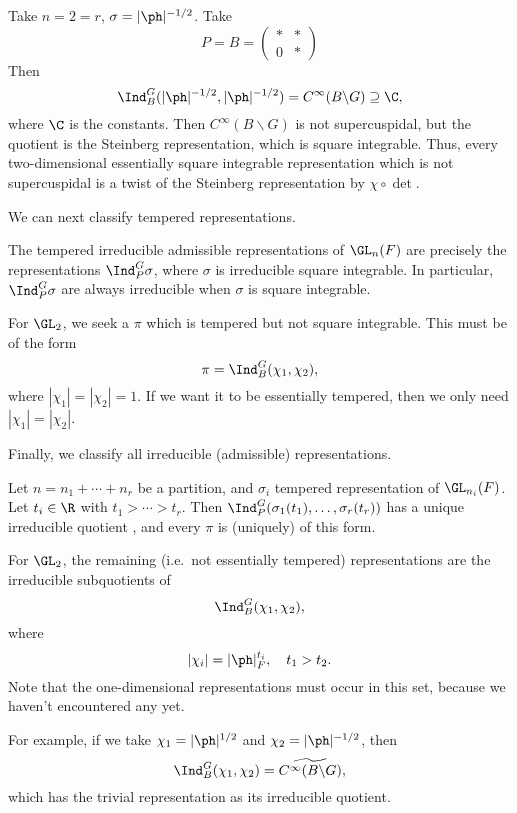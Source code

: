 \documentclass[a4paper]{article}
\begin{document}
\begin{eg}
  Take $n = 2 = r$, $\sigma = |\ph|^{-1/2}$. Take
  \[
    P = B =
    \begin{pmatrix}
      * & *\\
      0 & *
    \end{pmatrix}
  \]
  Then
  \[
    \Ind_B^G(|\ph|^{-1/2}, |\ph|^{-1/2}) = C^\infty(B \backslash G) \supseteq \C,
  \]
  where $\C$ is the constants. Then $C^\infty(B\backslash G)$ is not supercuspidal, but the quotient is the Steinberg representation, which is square integrable. Thus, every two-dimensional essentially square integrable representation which is not supercuspidal is a twist of the Steinberg representation by $\chi \circ \det$.
\end{eg}

We can next classify tempered representations.
\begin{thm}
  The tempered irreducible admissible representations of $\GL_n(F)$ are precisely the representations $\Ind_P^G \sigma$, where $\sigma$ is irreducible square integrable. In particular, $\Ind_P^G \sigma$ are always irreducible when $\sigma$ is square integrable.
\end{thm}

\begin{eg}
  For $\GL_2$, we seek a $\pi$ which is tempered but not square integrable. This must be of the form
  \[
    \pi = \Ind_B^G (\chi_1, \chi_2),
  \]
  where $|\chi_1| = |\chi_2| = 1$. If we want it to be essentially tempered, then we only need $|\chi_1| = |\chi_2|$.
\end{eg}

Finally, we classify all irreducible (admissible) representations.
\begin{thm}
  Let $n = n_1 + \cdots + n_r$ be a partition, and $\sigma_i$ tempered representation of $\GL_{n_i}(F)$. Let $t_i \in \R$ with $t_1 > \cdots > t_r$. Then $\Ind_P^G(\sigma_1(t_1), \ldots, \sigma_r(t_r))$ has a unique irreducible quotient , and every $\pi$ is (uniquely) of this form.
\end{thm}
\begin{eg}
  For $\GL_2$, the remaining (i.e.\ not essentially tempered) representations are the irreducible subquotients of
  \[
    \Ind_B^G (\chi_1, \chi_2),
  \]
  where
  \[
    |\chi_i| = |\ph |_F^{t_i},\quad t_1 > t_2.
  \]
  Note that the one-dimensional representations must occur in this set, because we haven't encountered any yet.

  For example, if we take $\chi_1 = |\ph|^{1/2}$ and $\chi_2 = |\ph|^{-1/2}$, then
  \[
    \Ind_B^G(\chi_1, \chi_2) = \widetilde{C^\infty(B \backslash G)},
  \]
  which has the trivial representation as its irreducible quotient.
\end{eg}
\end{document}
